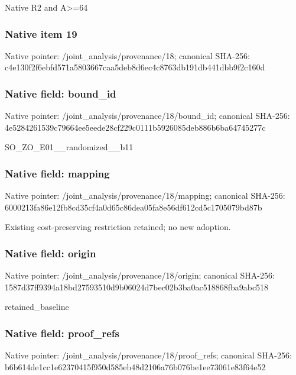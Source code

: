 \documentclass[10pt,a4paper]{article}
\begin{document}
\begingroup\raggedright\sloppy Native R2 and A>=\allowbreak{}64\par\endgroup

\subsubsection{Native item 19}
Native pointer: /joint\_\allowbreak{}analysis/provenance/18; canonical SHA-256: c4e130f2f6ebfd571a5803667caa5deb8d6ec4c8763db191db441dbb9f2c160d

\subsubsection{Native field: bound\_\allowbreak{}id}
Native pointer: /joint\_\allowbreak{}analysis/provenance/18/bound\_\allowbreak{}id; canonical SHA-256: 4e5284261539c79664ee5eede28cf229c0111b5926085deb886b6ba64745277c

\begingroup\raggedright\sloppy SO\_\allowbreak{}ZO\_\allowbreak{}E01\_\allowbreak{}\_\allowbreak{}randomized\_\allowbreak{}\_\allowbreak{}b11\par\endgroup

\subsubsection{Native field: mapping}
Native pointer: /joint\_\allowbreak{}analysis/provenance/18/mapping; canonical SHA-256: 6000213fa86e12fb8cd35cf4a0d65c86dea05fa8e56df612cd5c1705079bd87b

\begingroup\raggedright\sloppy Existing cost-preserving restriction retained;\allowbreak{} no new adoption.\par\endgroup

\subsubsection{Native field: origin}
Native pointer: /joint\_\allowbreak{}analysis/provenance/18/origin; canonical SHA-256: 1587d37ff9394a18bd27593510d9b06024d7bec02b3ba0ac518868fba9abc518

\begingroup\raggedright\sloppy retained\_\allowbreak{}baseline\par\endgroup

\subsubsection{Native field: proof\_\allowbreak{}refs}
Native pointer: /joint\_\allowbreak{}analysis/provenance/18/proof\_\allowbreak{}refs; canonical SHA-256: b6b614de1cc1e62370415f950d585eb48d2106a76b076be1ee73061e83f64e52
\end{document}
